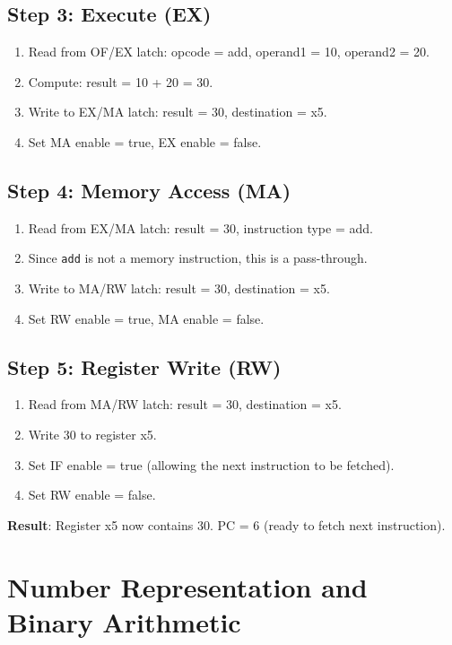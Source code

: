 \documentclass[12pt,a4paper]{article}
\begin{document}
\subsection{Step 3: Execute (EX)}

\begin{enumerate}
    \item Read from OF/EX latch: opcode = add, operand1 = 10, operand2 = 20.
    \item Compute: result = 10 + 20 = 30.
    \item Write to EX/MA latch: result = 30, destination = x5.
    \item Set MA enable = true, EX enable = false.
\end{enumerate}

\subsection{Step 4: Memory Access (MA)}

\begin{enumerate}
    \item Read from EX/MA latch: result = 30, instruction type = add.
    \item Since \texttt{add} is not a memory instruction, this is a pass-through.
    \item Write to MA/RW latch: result = 30, destination = x5.
    \item Set RW enable = true, MA enable = false.
\end{enumerate}

\subsection{Step 5: Register Write (RW)}

\begin{enumerate}
    \item Read from MA/RW latch: result = 30, destination = x5.
    \item Write 30 to register x5.
    \item Set IF enable = true (allowing the next instruction to be fetched).
    \item Set RW enable = false.
\end{enumerate}

\textbf{Result}: Register x5 now contains 30. PC = 6 (ready to fetch next instruction).

\section{Number Representation and Binary Arithmetic}
\end{document}
